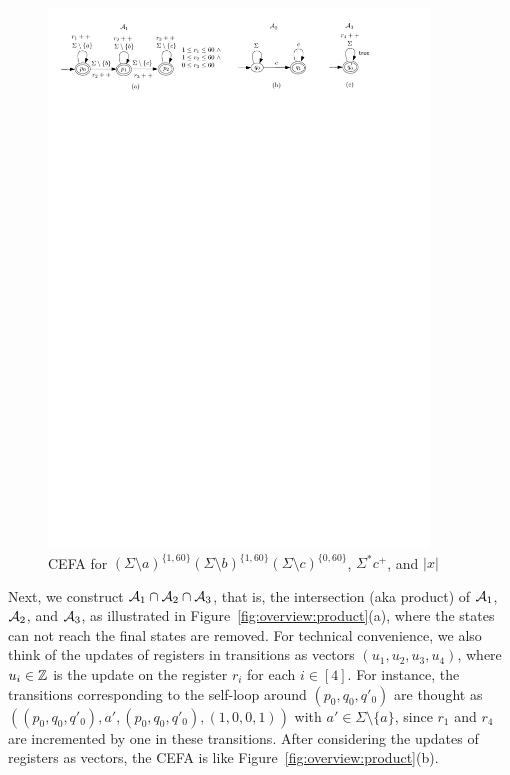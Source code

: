 \begin{figure}[ht]
\vspace{-3mm}
  \centering
  \includegraphics[width = 0.9\textwidth]{sections/overview-cefa.pdf}
  \caption{CEFA for $(\Sigma \setminus a)^{\{1, 60\}} (\Sigma \setminus b)^{\{1, 60\}} (\Sigma \setminus c)^{\{0, 60\}}$, $\Sigma^* c^+$, and $|x|$}
  \label{fig:overview}
\vspace{-3mm}
\end{figure}

Next, 
we construct $\mathcal{A}_1 \cap \mathcal{A}_2 \cap \mathcal{A}_3$, that is, the intersection (aka product) of $\mathcal{A}_1$, $\mathcal{A}_2$, and $\mathcal{A}_3$, as illustrated in Figure~\ref{fig:overview:product}(a), where the states can not reach the final states are removed. 
For technical convenience, we also think of the updates of registers in transitions as vectors $(u_1, u_2, u_3, u_4)$, where $u_i \in \mathbb{Z}$ is the update on the register $r_{i}$ for each $i \in [4]$. For instance, the transitions corresponding to the self-loop around $(p_0, q_0, q'_0)$ are thought as $((p_0, q_0, q'_0), a', (p_0, q_0, q'_0), (1,0,0,1))$ with $a' \in \Sigma \setminus \{a\}$, since $r_1$ and $r_4$ are incremented by one in these transitions. After considering the updates of registers as vectors, the CEFA is like Figure~\ref{fig:overview:product}(b).

